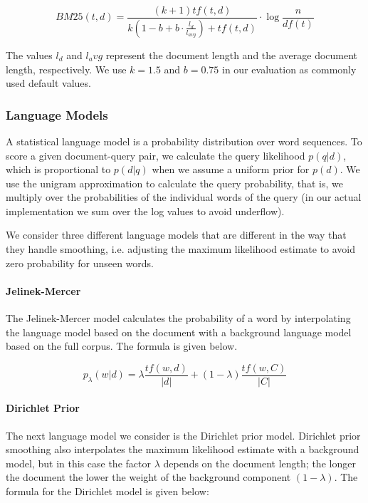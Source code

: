 \begin{equation*}
BM25(t,d) = \frac{(k + 1) tf(t,d)}{k(1 - b + b \cdot \frac{l_d}{l_{avg}} ) + tf(t,d)} \cdot \log\frac{n}{df(t)} 
\end{equation*}

The values $l_d$ and $l_avg$ represent the document length and the average
document length, respectively.
We use $k = 1.5$ and $b = 0.75$ in our evaluation as commonly used default values.
 
\subsubsection{Language Models}

A statistical language model is a probability distribution over word sequences.
To score a given document-query pair, we calculate the query likelihood
$p(q|d)$, which is proportional to $p(d|q)$ when we assume a uniform prior for $p(d)$.
We use the unigram approximation to calculate the query probability,
that is, we multiply over the probabilities of the individual words of the query
(in our actual implementation we sum over the log values to avoid underflow).

We consider three different language models that are different in the way that
they handle smoothing, i.e. adjusting the maximum likelihood estimate to avoid 
zero probability for unseen words.

\paragraph{Jelinek-Mercer}

The Jelinek-Mercer model calculates the probability of a word by
interpolating the language model based on the document with
a background language model based on the full corpus.
The formula is given below.

\begin{equation*}
p_{\lambda}(w | d) = \lambda \frac{tf(w,d)}{|d|} + (1 - \lambda) \frac{tf(w,C)}{|C|}
\end{equation*}


\paragraph{Dirichlet Prior}

The next language model we consider is the Dirichlet prior model.
Dirichlet prior smoothing also interpolates the maximum 
likelihood estimate with a background model,
but in this case the factor $\lambda$ depends on the document length;
the longer the document the lower the weight of the background component $(1-\lambda)$.
The formula for the Dirichlet model is given below:

